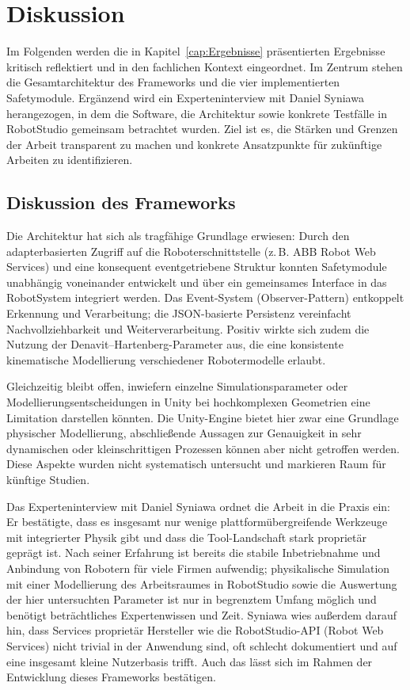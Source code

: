 \chapter{Diskussion}
\label{cap:diskussion}
Im Folgenden werden die in
Kapitel~\ref{cap:Ergebnisse} präsentierten
Ergebnisse kritisch reflektiert und in den fachlichen Kontext eingeordnet. Im
Zentrum stehen die Gesamtarchitektur des Frameworks und die vier implementierten
Safetymodule. Ergänzend wird ein Experteninterview mit Daniel Syniawa
herangezogen, in dem die Software, die Architektur sowie konkrete Testfälle in
RobotStudio gemeinsam betrachtet wurden. Ziel ist es, die Stärken und Grenzen
der Arbeit transparent zu machen und konkrete Ansatzpunkte für zukünftige
Arbeiten zu identifizieren.

\section{Diskussion des Frameworks}

Die Architektur hat sich als tragfähige Grundlage erwiesen: Durch den
adapterbasierten Zugriff auf die Roboterschnittstelle (z.\,B. ABB Robot Web
Services) und eine konsequent eventgetriebene Struktur konnten
Safetymodule unabhängig voneinander entwickelt und über ein gemeinsames
Interface in das RobotSystem integriert werden. Das Event-System
(Observer-Pattern) entkoppelt Erkennung und Verarbeitung; die JSON-basierte
Persistenz vereinfacht Nachvollziehbarkeit und Weiterverarbeitung. Positiv
wirkte sich zudem die Nutzung der Denavit–Hartenberg-Parameter aus, die eine
konsistente kinematische Modellierung verschiedener Robotermodelle erlaubt.

Gleichzeitig bleibt offen, inwiefern einzelne Simulationsparameter
oder Modellierungsentscheidungen in Unity bei hochkomplexen Geometrien eine
Limitation darstellen könnten. Die Unity-Engine bietet hier zwar eine
Grundlage physischer Modellierung, abschließende Aussagen zur Genauigkeit in
sehr dynamischen oder kleinschrittigen Prozessen können aber nicht getroffen
werden. Diese Aspekte wurden nicht systematisch untersucht und markieren Raum
für künftige Studien.

Das Experteninterview mit Daniel Syniawa ordnet die Arbeit in die
Praxis ein: Er bestätigte, dass es insgesamt nur wenige plattformübergreifende
Werkzeuge mit integrierter Physik gibt und dass die Tool-Landschaft stark
proprietär geprägt ist. Nach seiner Erfahrung ist bereits die stabile
Inbetriebnahme und Anbindung von Robotern für viele Firmen aufwendig;
physikalische Simulation mit einer Modellierung des Arbeitsraumes in RobotStudio
sowie die Auswertung der hier untersuchten Parameter ist nur in begrenztem
Umfang möglich und benötigt beträchtliches Expertenwissen und Zeit. Syniawa wies
außerdem darauf hin, dass Services proprietär Hersteller wie die RobotStudio-API
(Robot Web Services) nicht trivial in der Anwendung sind, oft schlecht
dokumentiert und auf eine insgesamt kleine Nutzerbasis trifft. Auch das lässt
sich im Rahmen der Entwicklung dieses Frameworks bestätigen.

